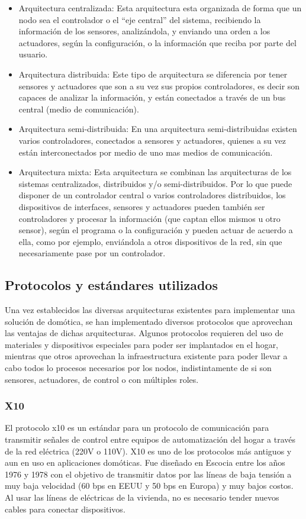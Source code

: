 \begin{itemize}
\item Arquitectura centralizada: Esta arquitectura esta organizada de forma que un nodo sea el controlador o el ``eje central'' del sistema, recibiendo la información de los sensores, analizándola, y enviando una orden a los actuadores, según la configuración, o la información que reciba por parte del usuario.
\item Arquitectura distribuida: Este tipo de arquitectura se diferencia por tener sensores y actuadores que son a su vez sus propios controladores, es decir son capaces de analizar la información, y están conectados a través de un bus central (medio de comunicación).
\item Arquitectura semi-distribuida: En una arquitectura semi-distribuidas existen varios controladores, conectados a sensores y actuadores, quienes a su vez están interconectados por medio de uno mas medios de comunicación.
\item Arquitectura mixta: Esta arquitectura se combinan las arquitecturas de los sistemas centralizados, distribuidos y/o semi-distribuidos. Por lo que puede disponer de un controlador central o varios controladores distribuidos, los dispositivos de interfaces, sensores y actuadores pueden también ser controladores y procesar la información (que captan ellos mismos u otro sensor), según el programa o la configuración y pueden actuar de acuerdo a ella, como por ejemplo, enviándola a otros dispositivos de la red, sin que necesariamente pase por un controlador.
\end{itemize}

\subsection{Protocolos y estándares utilizados}
Una vez establecidos las diversas arquitecturas existentes para implementar una solución de domótica, se han implementado diversos protocolos que aprovechan las ventajas de dichas arquitecturas. Algunos protocolos requieren del uso de materiales y dispositivos especiales para poder ser implantados en el hogar, mientras que otros aprovechan la infraestructura existente para poder llevar a cabo todos lo procesos necesarios por los nodos, indistintamente de si son sensores, actuadores, de control o con múltiples roles.

\subsubsection{X10}
El protocolo x10 es un estándar para un protocolo de comunicación para transmitir señales de control entre equipos de automatización del hogar a través de la red eléctrica (220V o 110V). X10 es uno de los protocolos más antiguos y aun  en uso en aplicaciones domóticas. Fue diseñado en Escocia entre los años 1976 y 1978 con el objetivo de transmitir datos por las líneas de baja tensión a muy baja velocidad (60 bps en EEUU y 50 bps en Europa) y muy bajos costos. Al usar las líneas de eléctricas de la vivienda, no es necesario tender nuevos cables para conectar dispositivos.\cite{iecor}\\

